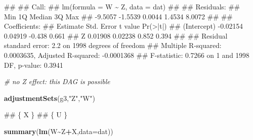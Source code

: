 \documentclass[
]{book}
\newenvironment{Shaded}{\begin{snugshade}}{\end{snugshade}}
\newcommand{\AttributeTok}[1]{\textcolor[rgb]{0.13,0.29,0.53}{#1}}
\newcommand{\CommentTok}[1]{\textcolor[rgb]{0.56,0.35,0.01}{\textit{#1}}}
\newcommand{\FunctionTok}[1]{\textcolor[rgb]{0.13,0.29,0.53}{\textbf{#1}}}
\newcommand{\NormalTok}[1]{#1}
\newcommand{\SpecialCharTok}[1]{\textcolor[rgb]{0.81,0.36,0.00}{\textbf{#1}}}
\newcommand{\StringTok}[1]{\textcolor[rgb]{0.31,0.60,0.02}{#1}}
\begin{document}
\begin{Shaded}
\begin{Highlighting}[]
\NormalTok{\#\# }
\NormalTok{\#\# Call:}
\NormalTok{\#\# lm(formula = W \textasciitilde{} Z, data = dat)}
\NormalTok{\#\# }
\NormalTok{\#\# Residuals:}
\NormalTok{\#\#     Min      1Q  Median      3Q     Max }
\NormalTok{\#\# {-}9.5057 {-}1.5539  0.0044  1.4534  8.0072 }
\NormalTok{\#\# }
\NormalTok{\#\# Coefficients:}
\NormalTok{\#\#             Estimate Std. Error t value Pr(\textgreater{}|t|)}
\NormalTok{\#\# (Intercept) {-}0.02154    0.04919  {-}0.438    0.661}
\NormalTok{\#\# Z            0.01908    0.02238   0.852    0.394}
\NormalTok{\#\# }
\NormalTok{\#\# Residual standard error: 2.2 on 1998 degrees of freedom}
\NormalTok{\#\# Multiple R{-}squared:  0.0003635,  Adjusted R{-}squared:  {-}0.0001368 }
\NormalTok{\#\# F{-}statistic: 0.7266 on 1 and 1998 DF,  p{-}value: 0.3941}
\end{Highlighting}
\end{Shaded}

\begin{Shaded}
\begin{Highlighting}[]
\CommentTok{\# no Z effect: this DAG is possible}

\FunctionTok{adjustmentSets}\NormalTok{(g3,}\StringTok{"Z"}\NormalTok{,}\StringTok{"W"}\NormalTok{)}
\end{Highlighting}
\end{Shaded}

\begin{Shaded}
\begin{Highlighting}[]
\NormalTok{\#\# \{ X \}}
\NormalTok{\#\# \{ U \}}
\end{Highlighting}
\end{Shaded}

\begin{Shaded}
\begin{Highlighting}[]
\FunctionTok{summary}\NormalTok{(}\FunctionTok{lm}\NormalTok{(W}\SpecialCharTok{\textasciitilde{}}\NormalTok{Z}\SpecialCharTok{+}\NormalTok{X,}\AttributeTok{data=}\NormalTok{dat))}
\end{Highlighting}
\end{Shaded}
\end{document}
